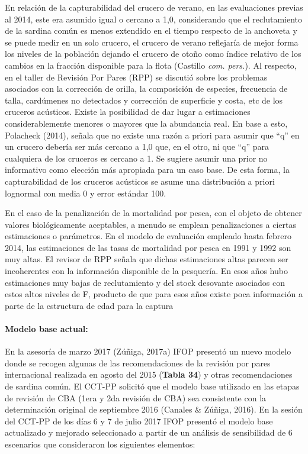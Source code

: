 \documentclass[
  spanish,
]{article}
\begin{document}
En relación de la capturabilidad del crucero de verano, en las
evaluaciones previas al 2014, este era asumido igual o cercano a 1,0,
considerando que el reclutamiento de la sardina común es menos extendido
en el tiempo respecto de la anchoveta y se puede medir en un solo
crucero, el crucero de verano reflejaría de mejor forma los niveles de
la población dejando el crucero de otoño como índice relativo de los
cambios en la fracción disponible para la flota (Castillo \emph{com.
pers.}). Al respecto, en el taller de Revisión Por Pares (RPP) se
discutió sobre los problemas asociados con la corrección de orilla, la
composición de especies, frecuencia de talla, cardúmenes no detectados y
corrección de superficie y costa, etc de los cruceros acústicos. Existe
la posibilidad de dar lugar a estimaciones considerablemente menores o
mayores que la abundancia real. En base a esto, Polacheck (2014), señala
que no existe una razón a priori para asumir que ``q'' en un crucero
debería ser más cercano a 1,0 que, en el otro, ni que ``q'' para
cualquiera de los cruceros es cercano a 1. Se sugiere asumir una prior
no informativo como elección más apropiada para un caso base. De esta
forma, la capturabilidad de los cruceros acústicos se asume una
distribución a priori lognormal con media 0 y error estándar 100.

En el caso de la penalización de la mortalidad por pesca, con el objeto
de obtener valores biológicamente aceptables, a menudo se emplean
penalizaciones a ciertas estimaciones o parámetros. En el modelo de
evaluación empleado hasta febrero 2014, las estimaciones de las tasas de
mortalidad por pesca en 1991 y 1992 son muy altas. El revisor de RPP
señala que dichas estimaciones altas parecen ser incoherentes con la
información disponible de la pesquería. En esos años hubo estimaciones
muy bajas de reclutamiento y del stock desovante asociados con estos
altos niveles de F, producto de que para esos años existe poca
información a parte de la estructura de edad para la captura

\hypertarget{modelo-base-actual}{%
\paragraph{Modelo base actual:}\label{modelo-base-actual}}

En la asesoría de marzo 2017 (Zúñiga, 2017a) IFOP presentó un nuevo
modelo donde se recogen algunas de las recomendaciones de la revisión
por pares internacional realizada en agosto del 2015 (\textbf{Tabla 34})
y otras recomendaciones de sardina común. El CCT-PP solicitó que el
modelo base utilizado en las etapas de revisión de CBA (1era y 2da
revisión de CBA) sea consistente con la determinación original de
septiembre 2016 (Canales \& Zúñiga, 2016). En la sesión del CCT-PP de
los días 6 y 7 de julio 2017 IFOP presentó el modelo base actualizado y
mejorado seleccionado a partir de un análisis de sensibilidad de 6
escenarios que consideraron los siguientes elementos:
\end{document}
